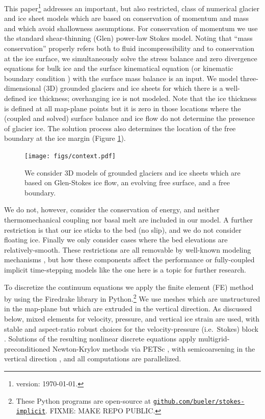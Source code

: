 \documentclass[letterpaper,final,12pt,reqno]{amsart}
\begin{document}
This paper\footnote{version: \today.} addresses an important, but also restricted, class of numerical glacier and ice sheet models which are based on conservation of momentum and mass and which avoid shallowness assumptions.  For conservation of momentum we use the standard shear-thinning (Glen) power-law Stokes model.  Noting that ``mass conservation'' properly refers both to fluid incompressibility and to conservation at the ice surface, we simultaneously solve the stress balance and zero divergence equations for bulk ice and the surface kinematical equation (or kinematic boundary condition \cite{GreveBlatter2009}) with the surface mass balance is an input.  We model three-dimensional (3D) grounded glaciers and ice sheets for which there is a well-defined ice thickness; overhanging ice is not modeled.  Note that the ice thickness is defined at all map-plane points but it is zero in those locations where the (coupled and solved) surface balance and ice flow do not determine the presence of glacier ice.  The solution process also determines the location of the free boundary at the ice margin \cite{SchoofHewitt2013} (Figure \ref{fig:context}).

\begin{figure}[ht]
\begin{center}
\texttt{[image: figs/context.pdf]}
\end{center}
\caption{We consider 3D models of grounded glaciers and ice sheets which are based on Glen-Stokes ice flow, an evolving free surface, and a free boundary.}
\label{fig:context}
\end{figure}

We do not, however, consider the conservation of energy, and neither thermomechanical coupling nor basal melt are included in our model.  A further restriction is that our ice sticks to the bed (no slip), and we do not consider floating ice.  Finally we only consider cases where the bed elevations are relatively-smooth.  These restrictions are all removable by well-known modeling mechanisms \cite[for example]{Aschwandenetal2012,Winkelmannetal2011}, but how these components affect the performance or fully-coupled implicit time-stepping models like the one here is a topic for further research.

To discretize the continuum equations we apply the finite element (FE) method \cite{Elmanetal2014} by using the Firedrake library \cite{Rathgeberetal2016} in Python.\footnote{These Python programs are open-source at \href{https://github.com/bueler/stokes-implicit}{\texttt{github.com/bueler/stokes-implicit}}.  FIXME: MAKE REPO PUBLIC.}  We use meshes which are unstructured in the map-plane but which are extruded \cite{Bercea2016,Gibsonetal2019,McRaeetal2016} in the vertical direction.  As discussed below, mixed elements for velocity, pressure, and vertical ice strain are used, with stable and aspect-ratio robust choices for the velocity-pressure (i.e.~Stokes) block \cite{Elmanetal2014}.  Solutions of the resulting nonlinear discrete equations apply multigrid-preconditioned Newton-Krylov methods \cite{Bueler2021} via PETSc \cite{Balayetal2020}, with semicoarsening in the vertical direction \cite{Tuminaroetal2016}, and all computations are parallelized.
\end{document}

